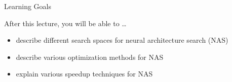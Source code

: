 \begin{frame}[c]{Learning Goals}

After this lecture, you will be able to \ldots

\begin{itemize}
	\item describe different \alert{search spaces} for neural architecture search (NAS)
	\item describe various \alert{optimization methods for NAS}
	\item explain various \alert{speedup techniques for NAS}
\end{itemize}


\end{frame}
